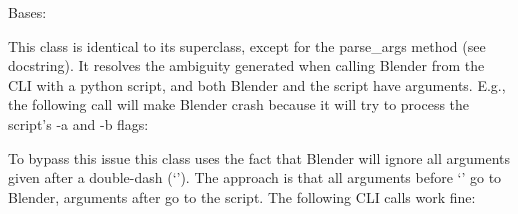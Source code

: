 \documentclass[letterpaper,10pt,english,openany,oneside]{sphinxmanual}
\begin{document}
\begin{fulllineitems}
\label{\detokenize{mpiea_mmr:mpiea_mmr.blender_utils.ArgumentParserForBlender}}
Bases: 

This class is identical to its superclass, except for the parse\_args
method (see docstring). It resolves the ambiguity generated when calling
Blender from the CLI with a python script, and both Blender and the script
have arguments. E.g., the following call will make Blender crash because
it will try to process the script’s -a and -b flags:

\begin{sphinxVerbatim}[commandchars=\\\{\}]
      
\end{sphinxVerbatim}

To bypass this issue this class uses the fact that Blender will ignore all
arguments given after a double-dash (‘\textendash{}’). The approach is that all
arguments before ‘\textendash{}’ go to Blender, arguments after go to the script.
The following CLI calls work fine:

\begin{sphinxVerbatim}[commandchars=\\\{\}]
       
   
\end{sphinxVerbatim}


\end{fulllineitems}
\end{document}
